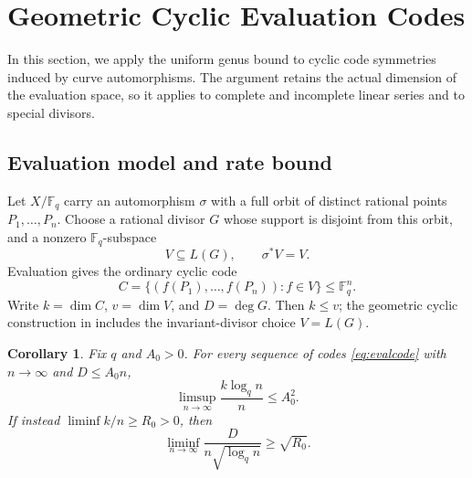 \documentclass[12pt,onecolumn,draftclsnofoot,letterpaper]{IEEEtran}
\newtheorem{corollary}{Corollary}
\theoremstyle{remark}
\newcommand{\F}{\mathbb F}
\begin{document}
\section{Geometric Cyclic Evaluation Codes}\label{sec:codes}
In this section, we apply the uniform genus bound to cyclic code symmetries induced by curve automorphisms. The argument retains the actual dimension of the evaluation space, so it applies to complete and incomplete linear series and to special divisors.

\subsection{Evaluation model and rate bound}
Let $X/\F_q$ carry an automorphism $\sigma$ with a full orbit of distinct rational points
$P_1,\ldots,P_n$. Choose a rational divisor $G$ whose support is disjoint from this orbit, and a nonzero $\F_q$-subspace
\[
 V\subseteq L(G),\qquad \sigma^*V=V.
\]
Evaluation gives the ordinary cyclic code
\begin{equation}
 C=\{(f(P_1),\ldots,f(P_n)):f\in V\}\le\F_q^n.
 \label{eq:evalcode}
\end{equation}
Write $k=\dim C$, $v=\dim V$, and $D=\deg G$. Then $k\le v$; the geometric cyclic construction in \cite{cabana} includes the invariant-divisor choice $V=L(G)$.

\begin{corollary}\label{cor:rate}
Fix $q$ and $A_0>0$. For every sequence of codes \eqref{eq:evalcode} with $n\to\infty$ and $D\le A_0n$,
\begin{equation}
 \limsup_{n\to\infty}\frac{k\log_qn}{n}\le A_0^2.
 \label{eq:ratebound}
\end{equation}
If instead $\liminf k/n\ge R_0>0$, then
\begin{equation}
 \liminf_{n\to\infty}\frac{D}{n\sqrt{\log_qn}}
 \ge\sqrt{R_0}.
 \label{eq:divisorlb}
\end{equation}
\end{corollary}
\end{document}
